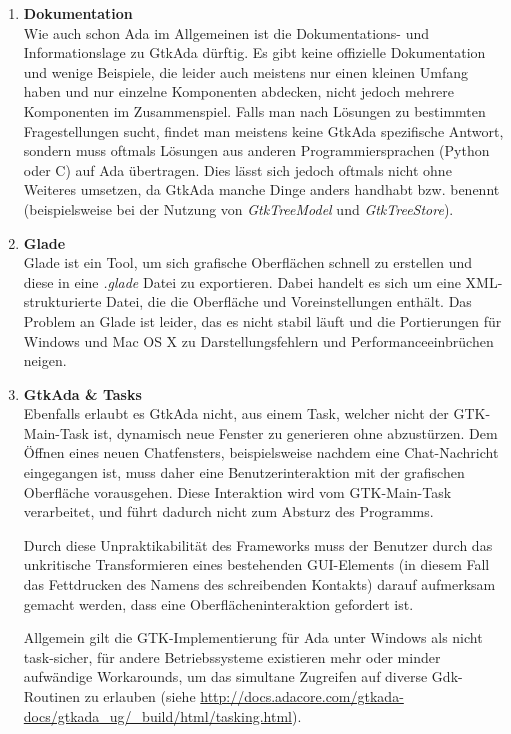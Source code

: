 \documentclass[12pt,a4paper,bibliography=totocnumbered,listof=totocnumbered]{scrartcl}
\begin{document}
\begin{enumerate}
	\item \textbf{Dokumentation}	\hfill \\
	Wie auch schon Ada im Allgemeinen ist die Dokumentations- und Informationslage zu GtkAda dürftig. Es gibt keine offizielle Dokumentation und wenige Beispiele, die leider auch meistens nur einen kleinen Umfang haben und nur einzelne Komponenten abdecken, nicht jedoch mehrere Komponenten im Zusammenspiel. Falls man nach Lösungen zu bestimmten Fragestellungen sucht, findet man meistens keine GtkAda spezifische Antwort, sondern muss oftmals Lösungen aus anderen Programmiersprachen (Python oder C) auf Ada übertragen. Dies lässt sich jedoch oftmals nicht ohne Weiteres umsetzen, da GtkAda manche Dinge anders handhabt bzw. benennt (beispielsweise bei der Nutzung von \textit{Gtk\textunderscore Tree\textunderscore Model} und \textit{Gtk\textunderscore Tree\textunderscore Store}).
	
	\item \textbf{Glade} \hfill \\
	Glade ist ein Tool, um sich grafische Oberflächen schnell zu erstellen und diese in eine \textit{.glade} Datei zu exportieren. Dabei handelt es sich um eine XML-strukturierte Datei, die die Oberfläche und Voreinstellungen enthält. Das Problem an Glade ist leider, das es nicht stabil läuft und die Portierungen für Windows und Mac OS X zu Darstellungsfehlern und Performanceeinbrüchen neigen.
	
	\item \textbf{GtkAda \& Tasks }\hfill \\	
	Ebenfalls erlaubt es GtkAda nicht, aus einem Task, welcher nicht der GTK-Main-Task ist, dynamisch neue Fenster zu generieren ohne abzustürzen. Dem Öffnen eines neuen Chatfensters, beispielsweise nachdem eine Chat-Nachricht eingegangen ist, muss daher eine Benutzerinteraktion mit der grafischen Oberfläche vorausgehen. Diese Interaktion wird vom GTK-Main-Task verarbeitet, und führt dadurch nicht zum Absturz des Programms.
	
	Durch diese Unpraktikabilität des Frameworks muss der Benutzer durch das unkritische Transformieren eines bestehenden GUI-Elements (in diesem Fall das Fettdrucken des Namens des schreibenden Kontakts) darauf aufmerksam gemacht werden, dass eine Oberflächeninteraktion gefordert ist.
	
	Allgemein gilt die GTK-Implementierung für Ada unter Windows als nicht task-sicher, für andere Betriebssysteme existieren mehr oder minder aufwändige Workarounds, um das simultane Zugreifen auf diverse Gdk-Routinen zu erlauben (siehe \url{http://docs.adacore.com/gtkada-docs/gtkada_ug/_build/html/tasking.html}).
	
	\end{enumerate}


\pagebreak



\renewcommand\refname{Quellenverzeichnis}

%
%
\end{document}
